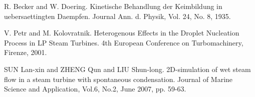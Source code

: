 
\begin{thebibliography}{10}

{\sc R. Becker and W. Doering}. {Kinetische Behandlung der Keimbildung in uebersaettingten Daempfen}. Journal Ann. d. Physik, Vol. 24, No. 8, 1935.



{\sc V. Petr and M. Kolovratnik}. {Heterogenous Effects in the Droplet Nucleation Process in LP Steam Turbines}. 4th European Conference on Turbomachinery, Firenze, 2001.



{\sc SUN Lan-xin and ZHENG Qun and LIU Shun-long}. {2D-simulation of wet steam flow in a steam turbine with spontaneous condensation}. Journal of Marine Science and Application, Vol.6, No.2, June 2007, pp. 59-63.

\end{thebibliography}
